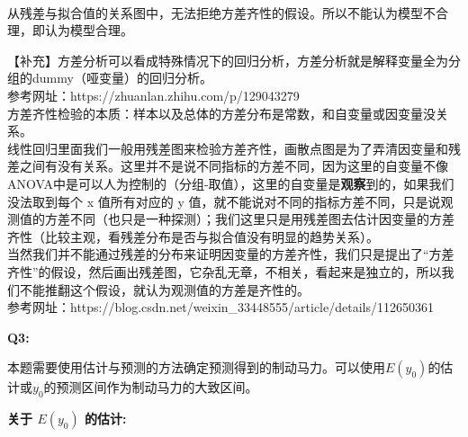 \documentclass[11pt]{ctexart}
\begin{document}
    \begin{center}
    \end{center}
    { \hspace*{\fill} \\}
    
    从残差与拟合值的关系图中，无法拒绝方差齐性的假设。所以不能认为模型不合理，即认为模型合理。

    【补充】方差分析可以看成特殊情况下的回归分析，方差分析就是解释变量全为分组的dummy（哑变量）的回归分析。\\
参考网址：https://zhuanlan.zhihu.com/p/129043279\\
方差齐性检验的本质：样本以及总体的方差分布是常数，和自变量或因变量没关系。\\
线性回归里面我们一般用残差图来检验方差齐性，画散点图是为了弄清因变量和残差之间有没有关系。这里并不是说不同指标的方差不同，因为这里的自变量不像ANOVA中是可以人为控制的（分组-取值），这里的自变量是\textbf{观察}到的，如果我们没法取到每个
x 值所有对应的 y
值，就不能说对不同的指标方差不同，只是说观测值的方差不同（也只是一种探测）；我们这里只是用残差图去估计因变量的方差齐性（比较主观，看残差分布是否与拟合值没有明显的趋势关系）。\\
当然我们并不能通过残差的分布来证明因变量的方差齐性，我们只是提出了``方差齐性''的假设，然后画出残差图，它杂乱无章，不相关，看起来是独立的，所以我们不能推翻这个假设，就认为观测值的方差是齐性的。\\
参考网址：https://blog.csdn.net/weixin\_33448555/article/details/112650361

    \textbf{Q3:}

本题需要使用估计与预测的方法确定预测得到的制动马力。可以使用\(E(y_0)\)的估计或\(y_0\)的预测区间作为制动马力的大致区间。

    \textbf{关于 \(E(y_0)\) 的估计:}
\end{document}
